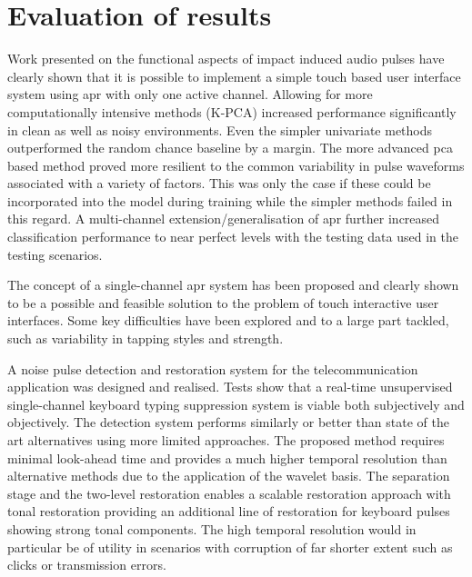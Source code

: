 \section{Evaluation of results}
Work presented on the functional aspects of impact induced audio pulses have clearly shown that it is possible to implement a simple touch based user interface system using \gls{apr} with only one active channel. Allowing for more computationally intensive methods (K-PCA) increased performance significantly in clean as well as noisy environments. Even the simpler univariate methods outperformed the random chance baseline by a margin. The more advanced \gls{pca} based method proved more resilient to the common variability in pulse waveforms associated with a variety of factors. This was only the case if these could be incorporated into the model during training while the simpler methods failed in this regard. A multi-channel extension/generalisation of \gls{apr} further increased classification performance to near perfect levels with the testing data used in the testing scenarios.

The concept of a single-channel \gls{apr} system has been proposed and clearly shown to be a possible and feasible solution to the problem of touch interactive user interfaces. Some key difficulties have been explored and to a large part tackled, such as variability in tapping styles and strength.

A noise pulse detection and restoration system for the telecommunication application was designed and realised. Tests show that a real-time unsupervised single-channel keyboard typing suppression system is viable both subjectively and objectively. The detection system performs similarly or better than state of the art alternatives using more limited approaches. The proposed method requires minimal look-ahead time and provides a much higher temporal resolution than alternative methods due to the application of the wavelet basis. The separation stage and the two-level restoration enables a scalable restoration approach with tonal restoration providing an additional line of restoration for keyboard pulses showing strong tonal components. The high temporal resolution would in particular be of utility in scenarios with corruption of far shorter extent such as clicks or transmission errors.

